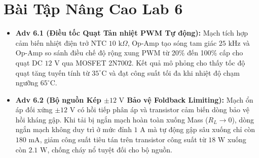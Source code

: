 \documentclass[12pt,a4paper]{report}
\begin{document}
\section{Bài Tập Nâng Cao Lab 6}
\begin{itemize}
    \item \textbf{Adv 6.1 (Điều tốc Quạt Tản nhiệt PWM Tự động):} Mạch tích hợp cảm biến nhiệt điện trở NTC $10\text{ k}\Omega$, Op-Amp tạo sóng tam giác $25\text{ kHz}$ và Op-Amp so sánh điều chế độ rộng xung PWM từ 20\% đến 100\% cấp cho quạt DC $12\text{ V}$ qua MOSFET 2N7002. Kết quả mô phỏng cho thấy tốc độ quạt tăng tuyến tính từ $35^\circ\text{C}$ và đạt công suất tối đa khi nhiệt độ chạm ngưỡng $65^\circ\text{C}$.
    \item \textbf{Adv 6.2 (Bộ nguồn Kép $\pm 12\text{ V}$ Bảo vệ Foldback Limiting):} Mạch ổn áp đối xứng $\pm 12\text{ V}$ có hồi tiếp phân áp và transistor cảm biến dòng bảo vệ hồi kháng gập. Khi tải bị ngắn mạch hoàn toàn xuống Mass ($R_L \to 0$), dòng ngắn mạch không duy trì ở mức đỉnh $1\text{ A}$ mà tự động gập sâu xuống chỉ còn $180\text{ mA}$, giảm công suất tiêu tán trên transistor công suất từ $18\text{ W}$ xuống còn $2.1\text{ W}$, chống cháy nổ tuyệt đối cho bộ nguồn.
\end{itemize}
\end{document}
